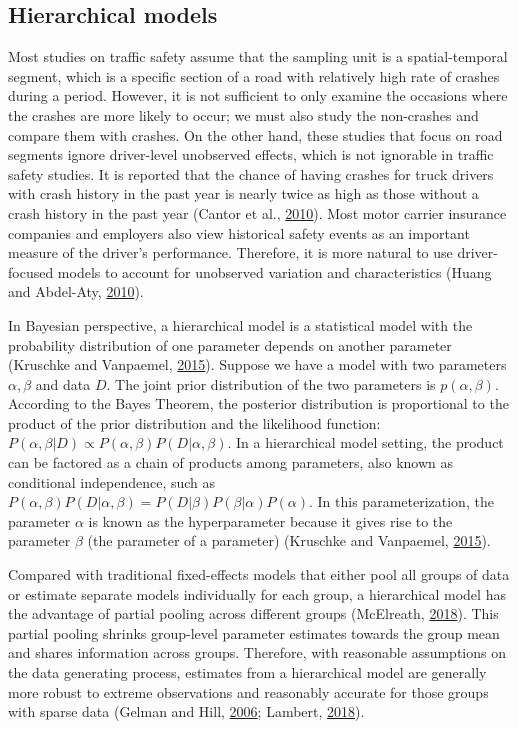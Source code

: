 \documentclass[12pt]{book}
\numberwithin{equation}{chapter}
\begin{document}
\hypertarget{hierarchical-models}{%
\subsection{Hierarchical models}\label{hierarchical-models}}

Most studies on traffic safety assume that the sampling unit is a spatial-temporal segment, which is a specific section of a road with relatively high rate of crashes during a period. However, it is not sufficient to only examine the occasions where the crashes are more likely to occur; we must also study the non-crashes and compare them with crashes. On the other hand, these studies that focus on road segments ignore driver-level unobserved effects, which is not ignorable in traffic safety studies. It is reported that the chance of having crashes for truck drivers with crash history in the past year is nearly twice as high as those without a crash history in the past year (Cantor et al., \protect\hyperlink{ref-cantor2010driver}{2010}). Most motor carrier insurance companies and employers also view historical safety events as an important measure of the driver's performance. Therefore, it is more natural to use driver-focused models to account for unobserved variation and characteristics (Huang and Abdel-Aty, \protect\hyperlink{ref-huang2010multilevel}{2010}).

In Bayesian perspective, a hierarchical model is a statistical model with the probability distribution of one parameter depends on another parameter (Kruschke and Vanpaemel, \protect\hyperlink{ref-kruschke2015bayesian}{2015}). Suppose we have a model with two parameters \(\alpha, \beta\) and data \(D\). The joint prior distribution of the two parameters is \(p(\alpha, \beta)\). According to the Bayes Theorem, the posterior distribution is proportional to the product of the prior distribution and the likelihood function: \(P(\alpha, \beta|D) \propto P(\alpha, \beta)P(D|\alpha,\beta)\). In a hierarchical model setting, the product can be factored as a chain of products among parameters, also known as conditional independence, such as \(P(\alpha, \beta)P(D|\alpha,\beta) = P(D|\beta)P(\beta|\alpha)P(\alpha)\). In this parameterization, the parameter \(\alpha\) is known as the hyperparameter because it gives rise to the parameter \(\beta\) (the parameter of a parameter) (Kruschke and Vanpaemel, \protect\hyperlink{ref-kruschke2015bayesian}{2015}).

Compared with traditional fixed-effects models that either pool all groups of data or estimate separate models individually for each group, a hierarchical model has the advantage of partial pooling across different groups (McElreath, \protect\hyperlink{ref-mcelreath2018statistical}{2018}). This partial pooling shrinks group-level parameter estimates towards the group mean and shares information across groups. Therefore, with reasonable assumptions on the data generating process, estimates from a hierarchical model are generally more robust to extreme observations and reasonably accurate for those groups with sparse data (Gelman and Hill, \protect\hyperlink{ref-gelman2006data}{2006}; Lambert, \protect\hyperlink{ref-lambert2018student}{2018}).
\end{document}
